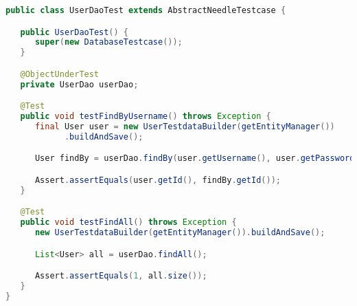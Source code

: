 \begin{lstlisting}[language={JAVA},caption=TestNG user dao test]
public class UserDaoTest extends AbstractNeedleTestcase {

   public UserDaoTest() {
      super(new DatabaseTestcase());
   }

   @ObjectUnderTest
   private UserDao userDao;

   @Test
   public void testFindByUsername() throws Exception {
      final User user = new UserTestdataBuilder(getEntityManager())
            .buildAndSave();

      User findBy = userDao.findBy(user.getUsername(), user.getPassword());

      Assert.assertEquals(user.getId(), findBy.getId());
   }

   @Test
   public void testFindAll() throws Exception {
      new UserTestdataBuilder(getEntityManager()).buildAndSave();

      List<User> all = userDao.findAll();

      Assert.assertEquals(1, all.size());
   }
}
\end{lstlisting}